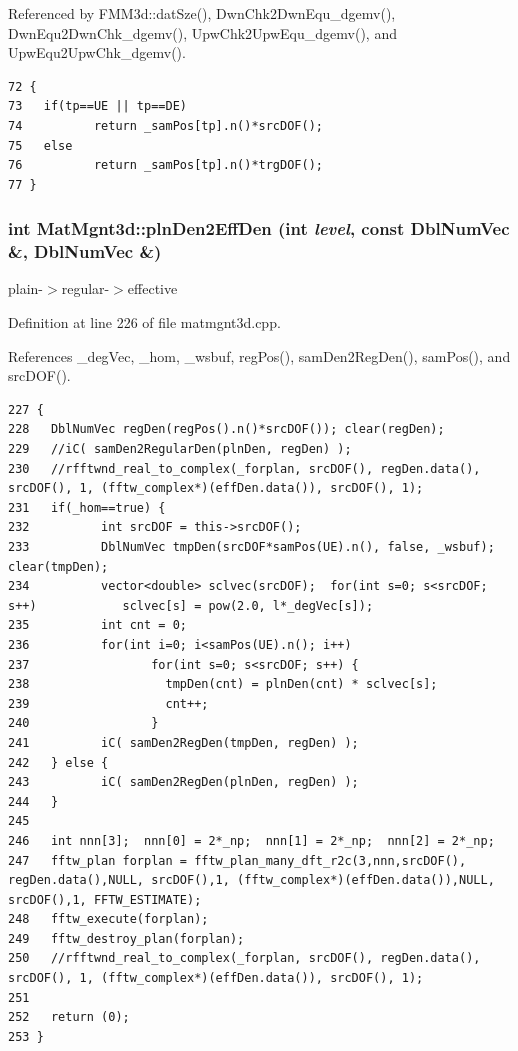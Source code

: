 Referenced by FMM3d::dat\-Sze(), Dwn\-Chk2Dwn\-Equ\_\-dgemv(), Dwn\-Equ2Dwn\-Chk\_\-dgemv(), Upw\-Chk2Upw\-Equ\_\-dgemv(), and Upw\-Equ2Upw\-Chk\_\-dgemv().

\footnotesize\begin{verbatim}72 {
73   if(tp==UE || tp==DE)
74          return _samPos[tp].n()*srcDOF();
75   else
76          return _samPos[tp].n()*trgDOF();
77 }
\end{verbatim}\normalsize 


\subsubsection{\setlength{\rightskip}{0pt plus 5cm}int Mat\-Mgnt3d::pln\-Den2Eff\-Den (int {\em level}, const Dbl\-Num\-Vec \&, Dbl\-Num\-Vec \&)}\label{classMatMgnt3d_401736fd8ff6ae54a15badf8b0a91e33_401736fd8ff6ae54a15badf8b0a91e33}


plain-$>$regular-$>$effective 



Definition at line 226 of file matmgnt3d.cpp.

References \_\-deg\-Vec, \_\-hom, \_\-wsbuf, reg\-Pos(), sam\-Den2Reg\-Den(), sam\-Pos(), and src\-DOF().

\footnotesize\begin{verbatim}227 {
228   DblNumVec regDen(regPos().n()*srcDOF()); clear(regDen);
229   //iC( samDen2RegularDen(plnDen, regDen) );
230   //rfftwnd_real_to_complex(_forplan, srcDOF(), regDen.data(), srcDOF(), 1, (fftw_complex*)(effDen.data()), srcDOF(), 1);
231   if(_hom==true) {
232          int srcDOF = this->srcDOF();
233          DblNumVec tmpDen(srcDOF*samPos(UE).n(), false, _wsbuf);         clear(tmpDen);
234          vector<double> sclvec(srcDOF);  for(int s=0; s<srcDOF; s++)            sclvec[s] = pow(2.0, l*_degVec[s]);
235          int cnt = 0;
236          for(int i=0; i<samPos(UE).n(); i++)
237                 for(int s=0; s<srcDOF; s++) {
238                   tmpDen(cnt) = plnDen(cnt) * sclvec[s];
239                   cnt++;
240                 }
241          iC( samDen2RegDen(tmpDen, regDen) );
242   } else {
243          iC( samDen2RegDen(plnDen, regDen) );
244   }
245   
246   int nnn[3];  nnn[0] = 2*_np;  nnn[1] = 2*_np;  nnn[2] = 2*_np;
247   fftw_plan forplan = fftw_plan_many_dft_r2c(3,nnn,srcDOF(), regDen.data(),NULL, srcDOF(),1, (fftw_complex*)(effDen.data()),NULL, srcDOF(),1, FFTW_ESTIMATE);
248   fftw_execute(forplan);
249   fftw_destroy_plan(forplan);
250   //rfftwnd_real_to_complex(_forplan, srcDOF(), regDen.data(), srcDOF(), 1, (fftw_complex*)(effDen.data()), srcDOF(), 1);
251   
252   return (0);
253 }
\end{verbatim}\normalsize 


